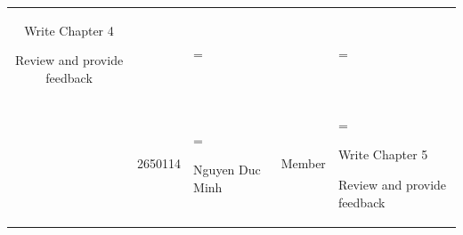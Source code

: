\documentclass[a4paper]{report}
\begin{document}
\begin{table}[H]
\begin{tabularx}{\textwidth}{
        c
        c
        >{\hsize=0.65\hsize\linewidth=\hsize\raggedright\arraybackslash}X
        l
        >{\hsize=1.35\hsize\linewidth=\hsize\raggedright\arraybackslash}X
    }
\begin{tabitem}[label=--]
                \item Write Chapter 4
                \item Review and provide feedback
            \end{tabitem}\\
        \addlinespace
        5 & 2650114 & Nguyen Duc Minh & Member & 
            \begin{tabitem}[label=--]
                \item Write Chapter 5
                \item Review and provide feedback
            \end{tabitem} \\
        \bottomrule
    \end{tabularx}
\end{table}
\newpage

\setcounter{page}{1}
\pagestyle{mainstyle}







\newpage
\begingroup
\raggedright\printbibliography[heading=bibintoc, title={REFERENCES}]
\endgroup
\end{document}
